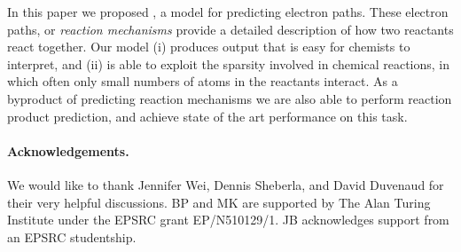 
In this paper we proposed \ourModel, a model for predicting electron paths.
These electron paths, or {\em reaction mechanisms} provide a detailed description of how two reactants react together. 
Our model (i) produces output that is easy for chemists to interpret, and (ii) is able to exploit the sparsity involved in chemical reactions, in which often only small numbers of atoms in the reactants interact.
As a byproduct of predicting reaction mechanisms we are also able to perform reaction product prediction,
 and achieve state of the art performance on this task.

 \paragraph{Acknowledgements.}




We would like to thank Jennifer Wei, Dennis Sheberla, and David Duvenaud for their very helpful discussions.
BP and MK are supported by The Alan Turing Institute under the EPSRC grant EP/N510129/1. 
JB acknowledges support from an EPSRC studentship.

